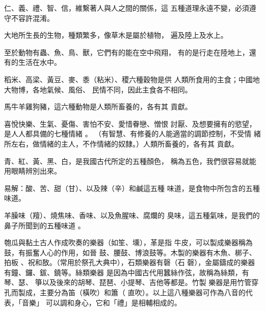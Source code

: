 \documentclass[avery5371,grid]{flashcards}
\begin{document}
{仁、義、禮、智、信，維繫著人與人之間的關係，這
五種道理永遠不變，必須遵守不容許混淆。} %
{} %



{大地所生長的生物，種類繁多，像草木是屬於植物，
遍及陸上及水上。} %
{} %

{至於動物有蟲、魚、鳥、獸，它們有的能在空中飛翔，
有的是行走在陸地上，還有的生活在水中。} %
{} %

{稻米、高梁、黃豆、麥、黍（粘米）、稷六種穀物是供
人類所食用的主食；中國地大物博，各地氣候、風俗、
民情不同，因此主食各不相同。} %
{} %

{馬牛羊雞狗豬，這六種動物是人類所畜養的，各有其
貢獻。} %
{} %



{喜悅快樂、生氣、憂傷、害怕不安、愛惜眷戀、憎恨
討厭、及想要擁有的慾望，是人人都具備的七種情緒
。} %
{（有智慧、有修養的人能適當的調節控制，不受情
緒所左右，做情緒的主人，不作情緒的奴隸。）人類所畜養的，各有其
貢獻。} %


{青、紅、黃、黑、白，是我國古代所定的五種顏色，
稱為五色，我們很容易就能用眼睛辨別出來。} %
{} %

{易解：酸、苦、甜（甘）、以及辣（辛）和鹹這五種
味道，是食物中所包含的五種味道。} %
{} %

{羊臊味（羶）、燒焦味、香味、以及魚腥味、腐爛的
臭味，這五種氣味，是我們的鼻子所聞到的五種味道
。} %
{} %

{匏瓜與黏土古人作成吹奏的樂器（如笙、壎），革是指
牛皮，可以製成樂器稱為鼓，有振奮人心的作用，如晉
鼓、腰鼓、博浪鼓等。木製的樂器有木魚、梆子、拍板
、祝和敔。（常用於祭孔大典中），石類樂器有磬（石
磬），金屬鑄成的樂器有鐘、鑼、鈸、鐃等。絲類樂器
是因為中國古代用蠶絲作弦，故稱為絲類，有琴、瑟、
箏以及後來的胡琴、琵琶、小提琴、吉他等都是。竹製
樂器是用竹管穿孔而製成，主要分為笛（橫吹）和簫（
直吹）。以上這八種樂器可作為八音的代表，「音樂」
可以調和身心，它和「禮」是相輔相成的。} %
{} %
\end{document}
